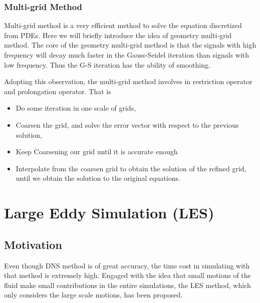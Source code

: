 \documentclass[english, nochinese]{pkupaper}
\begin{document}
\subsubsection{Multi-grid Method}
\par Multi-grid method is a very efficient method to solve the equation discretized from PDEs. Here we will briefly introduce the idea of geometry multi-grid method. The core of the geometry multi-grid method is that the signals with high frequency will decay much faster in the Gauss-Seidel iteration than signals with low frequency. Thus the G-S iteration has the ability of smoothing. 
\par Adopting this observation, the multi-grid method involves in restriction operator and prolongation operator. That is
\begin{itemize}
	\item Do some iteration in one scale of grids,
	\item Coarsen the grid, and solve the error vector with respect to the previous solution,
	\item Keep Coarsening our grid until it is accurate enough
	\item Interpolate from the coarsen grid to obtain the solution of the refined grid, until we obtain the solution to the original equations.
\end{itemize}


\section{Large Eddy Simulation (LES)}
\subsection{Motivation}
\par Even though DNS method is of great accuracy, the time cost in simulating with that method is extremely high. Engaged with the idea that small motions of the fluid make small contributions in the entire simulations, the LES method, which only considers the large scale motions, has been proposed.
\end{document}

